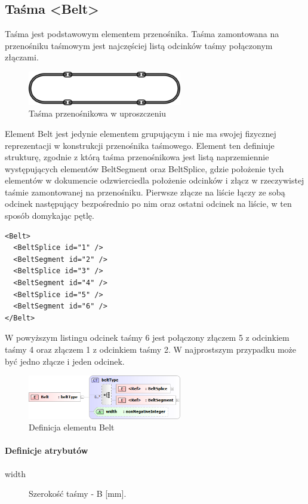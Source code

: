 \documentclass[12pt,a4paper]{article}
\begin{document}
\subsection{Taśma <Belt>}
Taśma jest podstawowym elementem przenośnika. Taśma zamontowana na przenośniku
taśmowym jest najczęściej listą odcinków taśmy połączonym złączami.

\begin{figure}[h]
  \centering
  \includegraphics[width=0.6\textwidth]{png/tasma}
  \caption{Taśma przenośnikowa w uproszczeniu}
  \label{fig:belt-drw}
\end{figure}

Element Belt jest jedynie elementem grupującym i nie ma swojej fizycznej
reprezentacji w konstrukcji przenośnika taśmowego. Element ten definiuje
strukturę, zgodnie z którą taśma przenośnikowa jest listą naprzemiennie
występujących elementów BeltSegment oraz BeltSplice, gdzie położenie tych
elementów w dokumencie odzwierciedla położenie odcinków i złącz w rzeczywistej
taśmie zamontowanej na przenośniku. Pierwsze złącze na liście łączy ze sobą
odcinek następujący bezpośrednio po nim oraz ostatni odcinek na liście, w ten
sposób domykając pętlę.

\begin{verbatim}
<Belt>
  <BeltSplice id="1" />
  <BeltSegment id="2" />
  <BeltSplice id="3" />
  <BeltSegment id="4" />
  <BeltSplice id="5" />
  <BeltSegment id="6" />
</Belt>
\end{verbatim}

W powyższym listingu odcinek taśmy 6 jest połączony złączem 5 z odcinkiem taśmy
4 oraz złączem 1 z odcinkiem taśmy 2. W najprostszym przypadku może być jedno
złącze i jeden odcinek.

\begin{figure}[h]
  \centering
  \includegraphics[width=0.6\textwidth]{png/belt_xsd2}
  \caption{Definicja elementu Belt}
  \label{fig:belt-xsd}
\end{figure}

\paragraph{Definicje atrybutów}
\begin{description}
\item[width] Szerokość taśmy - B [mm].
\end{description}
\end{document}
